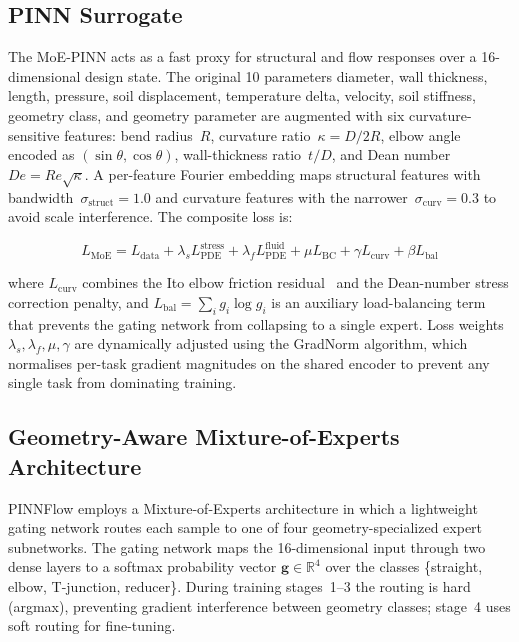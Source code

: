 \documentclass[conference]{IEEEtran}
\begin{document}
\subsection{PINN Surrogate}
\label{sec:pinn}

The MoE-PINN acts as a fast proxy for structural and flow responses over a 16-dimensional design state. The original 10 parameters diameter, wall thickness, length, pressure, soil displacement, temperature delta, velocity, soil stiffness, geometry class, and geometry parameter are augmented with six curvature-sensitive features: bend radius~$R$, curvature ratio~$\kappa = D/2R$, elbow angle encoded as $(\sin\theta, \cos\theta)$, wall-thickness ratio~$t/D$, and Dean number~$De = Re\sqrt{\kappa}$. A per-feature Fourier embedding maps structural features with bandwidth~$\sigma_{\text{struct}}=1.0$ and curvature features with the narrower~$\sigma_{\text{curv}}=0.3$ to avoid scale interference. The composite loss is:

\begin{equation}
L_{\text{MoE}} = L_{\text{data}} + \lambda_s L_{\text{PDE}}^{\text{stress}}
              + \lambda_f L_{\text{PDE}}^{\text{fluid}}
              + \mu L_{\text{BC}}
              + \gamma L_{\text{curv}}
              + \beta L_{\text{bal}}
\label{eq:loss}
\end{equation}

where $L_{\text{curv}}$ combines the Ito elbow friction residual~\cite{ito1959} and the Dean-number stress correction penalty, and $L_{\text{bal}} = \sum_i g_i \log g_i$ is an auxiliary load-balancing term that prevents the gating network from collapsing to a single expert. Loss weights $\lambda_s, \lambda_f, \mu, \gamma$ are dynamically adjusted using the GradNorm algorithm, which normalises per-task gradient magnitudes on the shared encoder to prevent any single task from dominating training.
 
\subsection{Geometry-Aware Mixture-of-Experts Architecture}
\label{sec:moe}

PINNFlow employs a Mixture-of-Experts architecture in which a lightweight gating network routes each sample to one of four geometry-specialized expert subnetworks. The gating network maps the 16-dimensional input through two dense layers to a softmax probability vector $\mathbf{g} \in \mathbb{R}^4$ over the classes \{straight, elbow, T-junction, reducer\}. During training stages~1--3 the routing is hard (argmax), preventing gradient interference between geometry classes; stage~4 uses soft routing for fine-tuning.
\end{document}
